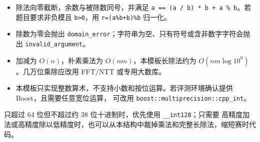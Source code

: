 \begin{warn}
\begin{itemize}
  \item 除法向零截断，余数与被除数同号，并满足
        \passthrough{\lstinline!a == (a / b) * b + a \% b!}。若题目要求非负模且
        \passthrough{\lstinline!b>0!}，用 \passthrough{\lstinline!r=(a\%b+b)\%b!} 归一化。
  \item 除数为零会抛出 \passthrough{\lstinline!domain_error!}；字符串为空、只有符号或含非数字字符会抛出
        \passthrough{\lstinline!invalid_argument!}。
  \item 加减为 \(O(n)\)，朴素乘法为 \(O(nm)\)，本模板长除法约为
        \(O(nm\log 10^9)\)。几万位乘除应改用 FFT/NTT 或专用大数库。
  \item 本模板只实现整数算术，不支持小数和按位运算。若评测环境确认提供 Boost，且需要任意宽位运算，
        可改用 \passthrough{\lstinline!boost::multiprecision::cpp_int!}。
\end{itemize}
\end{warn}

\begin{tip}
只超过 64 位但不超过约 38 位十进制时，优先使用 \passthrough{\lstinline!__int128!}；只需要
高精度加法或高精度除以低精度时，也可以从本结构中裁掉乘法和完整长除法，缩短赛时代码。
\end{tip}
